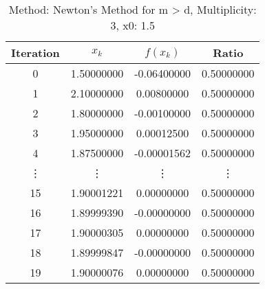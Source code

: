 \begin{table}
\centering
\caption{Method: Newton's Method for m > d, Multiplicity: 3, x0: 1.5}
\label{tab:table_Newton's_Method_for_m_>_d_3_1_5}
\begin{tabular}{c c c c}
\toprule
Iteration &      $x_k$ &    $f(x_k)$ &      Ratio \\
\midrule
        0 & 1.50000000 & -0.06400000 & 0.50000000 \\
        1 & 2.10000000 &  0.00800000 & 0.50000000 \\
        2 & 1.80000000 & -0.00100000 & 0.50000000 \\
        3 & 1.95000000 &  0.00012500 & 0.50000000 \\
        4 & 1.87500000 & -0.00001562 & 0.50000000 \\
   \vdots &     \vdots &      \vdots &     \vdots \\
       15 & 1.90001221 &  0.00000000 & 0.50000000 \\
       16 & 1.89999390 & -0.00000000 & 0.50000000 \\
       17 & 1.90000305 &  0.00000000 & 0.50000000 \\
       18 & 1.89999847 & -0.00000000 & 0.50000000 \\
       19 & 1.90000076 &  0.00000000 & 0.50000000 \\
\bottomrule
\end{tabular}
\end{table}
